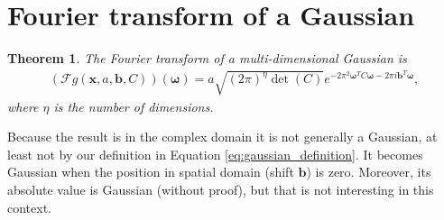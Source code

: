 \documentclass{paper}
\newtheorem{theorem}{Theorem}
\newcommand{\F}{\ensuremath{\mathcal{F}}}
\newcommand{\vr}[1]{\ensuremath{\boldsymbol{#1}}}
\newcommand{\omegavec}[0]{\ensuremath{\vr{\omega{}}}}
\newcommand{\bvec}[0]{\ensuremath{\vr{b}}}
\begin{document}
\clearpage
\section{Fourier transform of a Gaussian}
\begin{theorem}
	The Fourier transform of a multi-dimensional Gaussian is
	\begin{align}
	\label{eq:gaussian_fourier_transform}
	(\F g(\vr{x}, a, \bvec, C))(\omegavec) = a \sqrt{(2 \pi)^\eta \det(C)} e^{-2 \pi^2 \omegavec^T C \omegavec - 2\pi i \bvec^T \omegavec},
	\end{align}
	where $\eta$ is the number of dimensions.
\end{theorem}
Because the result is in the complex domain it is not generally a Gaussian, at least not by our definition in Equation \ref{eq:gaussian_definition}.
It becomes Gaussian when the position in spatial domain (shift $\bvec$) is zero.
Moreover, its absolute value is Gaussian (without proof), but that is not interesting in this context.
\end{document}
